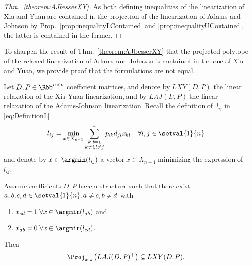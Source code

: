 \begin{proof}[Thm.~\ref{theorem:AJbesserXY}]
	As both defining inequalities of the linearization of Xia and Yuan are contained in the projection of the linearization of Adams and Johnson by Prop.~\ref{prop:inequalityLContained} and \ref{prop:inequalityUContained}, the latter is contained in the former.
\end{proof}

To sharpen the result of Thm.~\ref{theorem:AJbesserXY} that the projected polytope of the relaxed linearization of Adams and Johnson is contained in the one of Xia and Yuan, we provide proof that the formulations are not equal.

\begin{theorem}
\label{theorem:AJwirklichbesserXY}
	Let $D, P\in\Rbb^{n\times n}$ coefficient matrices, and denote by $LXY(D,P)$ the linear relaxation of the Xia-Yuan linearization, and by $LAJ(D,P)$ the linear relaxation of the Adams-Johnson linearization. Recall the definition of~$l_{ij}$ in \eqref{eq:DefinitionL}
	\begin{equation*}
		l_{ij} = \min_{x\in X_{n-1}}\sum_{\substack{k,l=1\\k\neq i, l\neq j}}^np_{ik}d_{jl}x_{kl}\quad\forall i,j\in\setval{1}{n}
	\end{equation*}
	and denote by $x\in\argmin(l_{ij})$ a vector $x\in X_{n-1}$ minimizing the expression of $l_{ij}$.
	
	Assume coefficients $D, P$ have a structure such that there exist $a,b,c,d \in\setval{1}{n},a\neq c, b\neq d$ with
	\begin{enumerate}
		\item $x_{cd}=1\;\forall x\in\argmin(l_{ab})$ and
		\item $x_{ab}=0\;\forall x\in\argmin(l_{cd})$.
	\end{enumerate}
	
	Then
	\begin{equation*}
		\Proj_{x,z}\left(LAJ(D,P)^+\right) \subsetneq LXY(D,P).
	\end{equation*}
\end{theorem}
